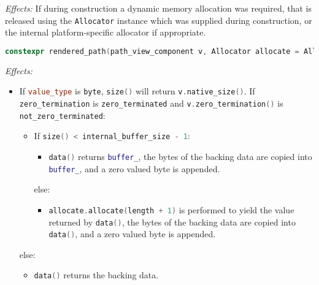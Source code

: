 \documentclass[11pt]{article}
\newcommand{\code}[2][cpp]{\lstinline[language=#1,basicstyle=\small\ttfamily]{#2}}
\newcommand{\desc}[1]{\textit{#1}}
\newcommand{\effects}{\desc{Effects: }}
\begin{document}
\effects If during construction a dynamic memory allocation was required, that is released using the \code{Allocator} instance which was supplied during construction, or the internal platform-specific allocator if appropriate.\\

\begin{lstlisting}[language=cpp]
    constexpr rendered_path(path_view_component v, Allocator allocate = Allocator());
\end{lstlisting}

\effects
\begin{itemize}
    \item If \code{value_type} is \code{byte}, \code{size()} will return \code{v.native_size()}. If \code{zero_termination} is \code{zero_terminated} and \code{v.zero_termination()} is \code{not_zero_terminated}:
    \begin{itemize}
        \item If \code{size() < internal_buffer_size - 1}:
        \begin{itemize}
            \item \code{data()} returns \code{buffer_}, the bytes of the backing data are copied into \code{buffer_}, and a zero valued byte is appended. 
        \end{itemize}
        else:
        \begin{itemize}
            \item \code{allocate.allocate(length + 1)} is performed to yield the value returned by \code{data()}, the bytes of the backing data are copied into \code{data()}, and a zero valued byte is appended.
        \end{itemize}
    \end{itemize}
    else:
    \begin{itemize}
        \item \code{data()} returns the backing data.
    \end{itemize}
    

\end{itemize}
\end{document}

